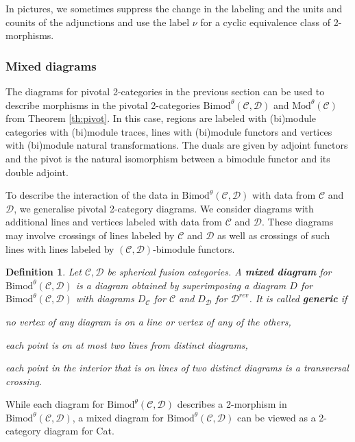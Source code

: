 \documentclass[1.5pt, a4paper]{article}
\newcommand{\mac}{\mathcal C}
\newcommand{\mad}{\mathcal D}
\newcommand{\Bimod}{\mathrm{Bimod}}
\newtheorem{definition}[theorem]{Definition}
\begin{document}
In pictures, we sometimes suppress the change in the labeling and the units and counits of the adjunctions and use the label $\nu$ for a cyclic equivalence class of 2-morphisms. 


\subsubsection{Mixed diagrams}
\label{subsec:bimod}



The diagrams for pivotal 2-categories in the previous section can be used to describe morphisms in the pivotal 2-categories
$\Bimod^\theta(\mac,\mad)$ and $\mathrm{Mod}^\theta(\mac)$ from Theorem \ref{th:pivot}.  In this case, regions are labeled with (bi)module categories with (bi)module traces, lines with (bi)module functors and vertices with (bi)module natural transformations. The duals are given by adjoint functors and the pivot is the natural isomorphism between a bimodule functor and its double adjoint. 

To describe the interaction of the data in $\Bimod^\theta(\mac,\mad)$ with data from $\mac$ and $\mad$, we generalise pivotal 2-category diagrams. We consider  diagrams with additional lines and vertices labeled with data from $\mac$ and $\mad$. These diagrams may involve  crossings of  lines labeled by $\mac$ and $\mad$ as well as  crossings of such lines with lines labeled by $(\mac,\mad)$-bimodule functors. 


\begin{definition} \label{def:mixeddiag}Let $\mac,\mad$ be spherical fusion categories. A {\bf mixed diagram} for $\Bimod^\theta(\mac,\mad)$ is a  diagram  obtained by superimposing a diagram $D$ for $\Bimod^\theta(\mac,\mad)$ with diagrams $D_\mac$ for $\mac$ and $D_\mad$ for $\mad^{rev}$. It is called {\bf generic} if
\begin{compactitem}
\item no vertex of any diagram is on a line or vertex of any of the others,
\item each point is on at most two lines from distinct diagrams,
\item  each point  in the interior that is on lines of two distinct diagrams is a transversal crossing.
\end{compactitem}
\end{definition}

While each diagram for $\Bimod^\theta(\mac,\mad)$ describes a 2-morphism in $\Bimod^\theta(\mac,\mad)$, a mixed diagram for $\Bimod^\theta(\mac,\mad)$ can be viewed as a 2-category diagram for Cat. 
\end{document}
